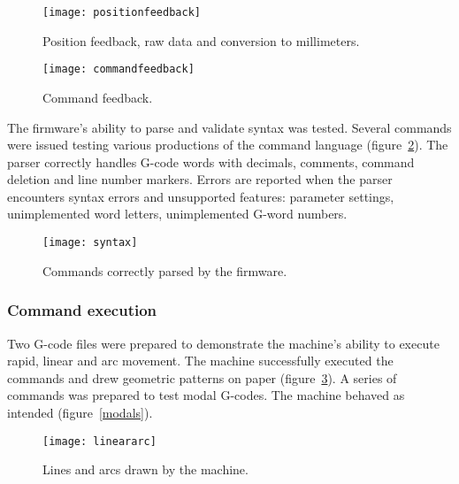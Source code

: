 \clearpage
\begin{figure}[ht]
    \centering
    \begin{minipage}{0.5\textwidth}
        \centering
        \texttt{[image: positionfeedback]}
        \caption{Position feedback, raw data and conversion to millimeters.}
        \label{posfeedback}
    \end{minipage}\hfill
    \begin{minipage}{0.5\textwidth}
        \centering
        \texttt{[image: commandfeedback]}
        \caption{Command feedback.}
        \label{comfeedback}
    \end{minipage}
\end{figure}

The firmware's ability to parse and validate syntax was tested. Several commands
were issued testing various productions of the command language
(figure~\ref{syntax}). The parser correctly handles G-code words with decimals,
comments, command deletion and line number markers. Errors are reported when
the parser encounters syntax errors and unsupported features: parameter
settings, unimplemented word letters, unimplemented G-word numbers.

\begin{figure}[ht]
    \begin{center}
        \texttt{[image: syntax]}
        \caption{Commands correctly parsed by the firmware.}
        \label{syntax}
    \end{center}
\end{figure}

\subsubsection{Command execution}

Two G-code files were prepared to demonstrate the machine's ability to execute
rapid, linear and arc movement. The machine successfully executed the commands
and drew geometric patterns on paper (figure~\ref{lineararc}). A series of
commands was prepared to test modal G-codes. The machine behaved as intended
(figure~\ref{modals}).

\begin{figure}[ht]
    \begin{center}
        \texttt{[image: lineararc]}
        \caption{Lines and arcs drawn by the machine.}
        \label{lineararc}
    \end{center}
\end{figure}

